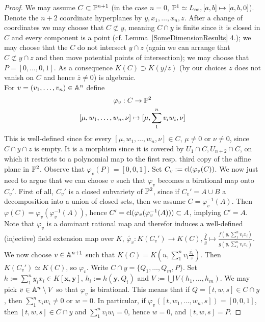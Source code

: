     \begin{proof}
        We may assume $C\subset \mathbb{P}^{n+1}$ (in the case $n=0$, $\mathbb{P}^{1}\simeq L_\infty, [a,b]\mapsto [a,b,0]$). Denote the $n+2$ coordinate hyperplanes by $y,x_1,\dots,x_n,z$.  After a change of coordinates we may choose that $C\not\subset y$, meaning  $C\cap y$ is finite since it is closed in $C$ and every component is a point (cf. Lemma~\ref{SomeDimensionResults} 4.); we may choose that the $C$ do not intersect $y\cap z$ (again we can arrange that $C\not\subset y\cap z$ and then move potential points of intersection); we may choose that $P=[0,\dots,0,1]$. As a consequence $K(C)\supset K(\overline{y}/\overline{z})$ (by our choices $z$ does not vanish on $C$ and hence $\overline{z}\neq0$) is algebraic.\\ 
        For $v=(v_1,\dots,v_n)\in \mathbb{A}^n$ define 
        \begin{gather*}
            \varphi_v : C \rightarrow \mathbb{P}^2\\
            [\mu, w_1,\dots,w_n,\nu]\mapsto [\mu,\sum_1^n v_iw_i,\nu]
        \end{gather*}
        This is well-defined since for every $[\mu, w_1,\dots,w_n,\nu]\in C$, $\mu\neq0$ or $\nu\neq 0$, since $C\cap y\cap z$ is empty. It is a morphism
        since it is covered by $U_1\cap C,U_{n+2}\cap C$, on which it restricts to a polynomial map to the first resp. third copy of the affine plane in $\mathbb{P}^2$. Observe that $\varphi_v(P)=[0,0,1]$. Set $C_v:= \mathrm{cl}(\varphi_v(C))$. We now just need to argue that we can choose $v$ such that $\varphi_v$ becomes a birational map onto $C_v'$. First of all, $C_v'$ is a closed subvariety of $\mathbb{P}^2$, since if $C_v'=A\cup B$ a decomposition into a union of closed sets, then we assume $C = \varphi_v^{-1}(A)$. Then $\varphi(C) = \varphi_v(\varphi_v^{-1}(A))$, hence $C'=\mathrm{cl}(\varphi_v(\varphi_v^{-1}(A)))\subset A$, implying $C'=A$. Note that $\varphi_v$ is a dominant rational map and therefor induces a well-defined (injective) field extension map over $K$, $\widetilde{\varphi_v}:K(C_v')\rightarrow K(C), \frac{\overline{f}}{\overline{g}}\mapsto \frac{\overline{f(y,\sum_1^nv_ix_i)}}{\overline{g(y,\sum_1^n v_ix_i)}}$. We now choose $v\in \mathbb{A}^{n+1}$ such that $K(C)=K(u,\sum_1^n v_i\frac{\overline{x_i}}{z})$. Then $K(C_v')\simeq K(C)$, so $\varphi_v$. Write $C\cap y=\{Q_1,\dots,Q_m,P\}$. Set $h:=\sum_1^n y_ix_i\in K[\mathbf{x},\mathbf{y}]$, $h_i:= h(\mathbf{y},Q_i)$ and $V:=\bigcup V(h_1,\dots,h_m)$. We may pick $v\in \mathbb{A}^n\setminus V$ so that $\varphi_v$ is birational. This means that if $Q=[t,w,s]\in C\cap y$, then $\sum_1^n v_iw_i\neq 0$ or $w=0$. In particular, if $\varphi_v([t,w_1,\dots,w_n,s])=[0,0,1]$, then $[t,w,s]\in C\cap y$ and $\sum_1^nv_iw_i=0$, hence $w=0$, and $[t,w,s]=P$.
    \end{proof}
